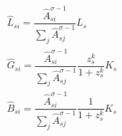 \begin{gather} \label{eq:output_allocation_allocation}
    \hat{L}_{si} = \dfrac{\hat{A}_{si}^{\sigma -1}}{\sum_j \hat{A}_{sj}^{\sigma -1}}L_s\\ 
    \hat{G}_{si} = \dfrac{\hat{A}_{si}^{\sigma -1}}{\sum_j \hat{A}_{sj}^{\sigma -1}}\dfrac{z_s^k}{1 + z_s^k} K_s\\ 
    \hat{B}_{si} = \dfrac{\hat{A}_{si}^{\sigma -1}}{\sum_j \hat{A}_{sj}^{\sigma -1}}\dfrac{1}{1 + z_s^k} K_s
\end{gather}